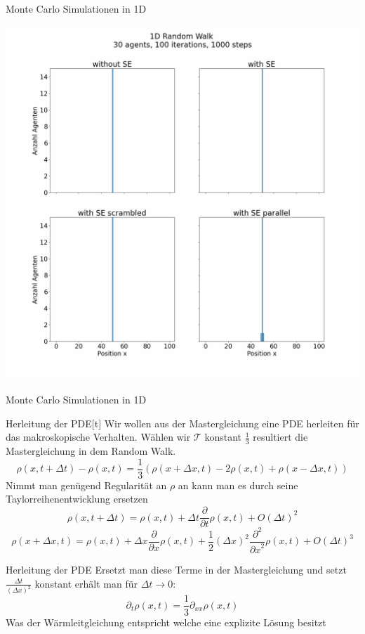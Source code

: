 \documentclass[xcolor=dvipsnames, aspectratio=169]{beamer}
\begin{document}
\begin{frame}{Monte Carlo Simulationen in 1D}
\begin{center}
\includegraphics[width=0.45\linewidth]{figures/Vergleich4/Vergleich4-0.png} 
\end{center}
\end{frame}

\begin{frame}{Monte Carlo Simulationen in 1D}
\begin{center}
\end{center}
\end{frame}

\begin{frame}{Herleitung der PDE}[t]
    Wir wollen aus der Mastergleichung eine PDE herleiten für das makroskopische Verhalten.
    Wählen wir $\mathcal{T}$ konstant $ \frac{1}{3}$ resultiert die Mastergleichung in dem Random Walk.
\begin{equation}
    \rho(x,t+\Delta t) - \rho(x,t)  =  \frac{1}{3} (\rho(x + \Delta x, t) - 2 \rho(x,t) + \rho(x - \Delta x, t))
\end{equation}
    Nimmt man genügend Regularität an $\rho$ an kann man es durch seine Taylorreihenentwicklung ersetzen
\pause
\begin{equation}
    \rho(x, t + \Delta t) = \rho(x, t) + \Delta t \frac{\partial}{\partial t}\rho(x, t) + O(\Delta t)^2
\end{equation}
\begin{equation}
    \rho(x + \Delta x, t) = \rho(x, t) + \Delta x \frac{\partial}{\partial x}\rho(x, t) + \frac{1}{2}(\Delta x)^2 \frac{\partial^2}{{\partial x}^2}\rho(x,t) + O(\Delta t)^3
\end{equation}
\end{frame}

\begin{frame}{Herleitung der PDE}
    Ersetzt man diese Terme in der Mastergleichung und setzt $\frac{\Delta t}{(\Delta x)^2}$ konstant erhält man für $\Delta t \rightarrow 0$:
    \begin{equation}
        \partial_t \rho (x,t) = \frac{1}{3} \partial_{x x} \rho(x,t)
    \end{equation} 
    Was der Wärmleitgleichung entspricht welche eine explizite Lösung besitzt
\end{frame}
\end{document}
